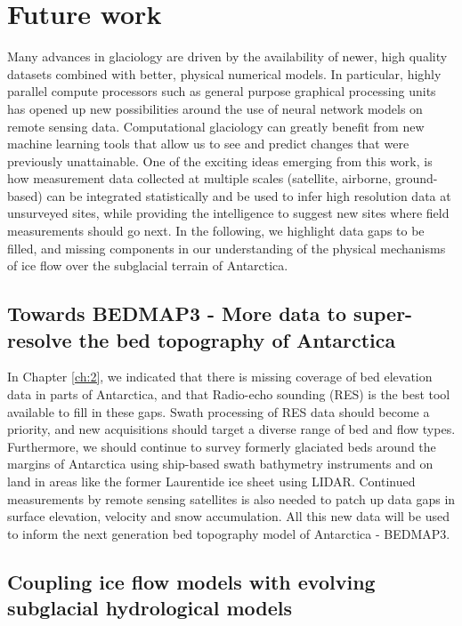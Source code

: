 \section{Future work}

Many advances in glaciology are driven by the availability of newer, high quality datasets combined with better, physical numerical models.
In particular, highly parallel compute processors such as general purpose graphical processing units has opened up new possibilities around the use of neural network models on remote sensing data.
Computational glaciology can greatly benefit from new machine learning tools that allow us to see and predict changes that were previously unattainable.
One of the exciting ideas emerging from this work, is how measurement data collected at multiple scales (satellite, airborne, ground-based) can be integrated statistically and be used to infer high resolution data at unsurveyed sites, while providing the intelligence to suggest new sites where field measurements should go next.
In the following, we highlight data gaps to be filled, and missing components in our understanding of the physical mechanisms of ice flow over the subglacial terrain of Antarctica.

\subsection{Towards BEDMAP3 - More data to super-resolve the bed topography of Antarctica}

In Chapter \ref{ch:2}, we indicated that there is missing coverage of bed elevation data in parts of Antarctica, and that Radio-echo sounding (\gls{RES}) is the best tool available to fill in these gaps.
Swath processing of RES data \citep[e.g.][]{HolschuhLinkingpostglaciallandscapes2020} should become a priority, and new acquisitions should target a diverse range of bed and flow types.
Furthermore, we should continue to survey formerly glaciated beds around the margins of Antarctica using ship-based swath bathymetry instruments and on land in areas like the former Laurentide ice sheet using LIDAR.
Continued measurements by remote sensing satellites is also needed to patch up data gaps in surface elevation, velocity and snow accumulation.
All this new data will be used to inform the next generation bed topography model of Antarctica - BEDMAP3.

\subsection{Coupling ice flow models with evolving subglacial hydrological models}

